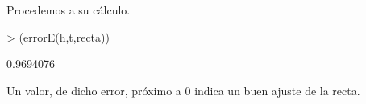 \documentclass [a4paper] {article}
\begin{document}
\bigskip
Procedemos a su cálculo.
\begin{Schunk}
\begin{Sinput}
> (errorE(h,t,recta))
\end{Sinput}
\begin{Soutput}
[1] 0.9694076
\end{Soutput}
\end{Schunk}

Un valor, de dicho error, próximo a 0 indica un buen ajuste de la recta.
\end{document}

